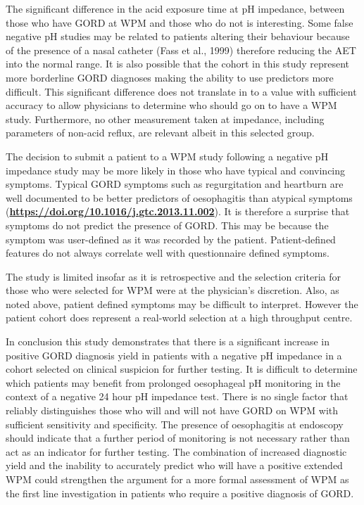 \documentclass[english,man,floatsintext]{apa6}
\begin{document}
The significant difference in the acid exposure time at pH impedance, between those who have GORD at WPM and those who do not is interesting. Some false negative pH studies may be related to patients altering their behaviour because of the presence of a nasal catheter (Fass et al., 1999) therefore reducing the AET into the normal range. It is also possible that the cohort in this study represent more borderline GORD diagnoses making the ability to use predictors more difficult. This significant difference does not translate in to a value with sufficient accuracy to allow physicians to determine who should go on to have a WPM study. Furthermore, no other measurement taken at impedance, including parameters of non-acid reflux, are relevant albeit in this selected group.

The decision to submit a patient to a WPM study following a negative pH impedance study may be more likely in those who have typical and convincing symptoms. Typical GORD symptoms such as regurgitation and heartburn are well documented to be better predictors of oesophagitis than atypical symptoms (\textbf{\url{https://doi.org/10.1016/j.gtc.2013.11.002}}). It is therefore a surprise that symptoms do not predict the presence of GORD. This may be because the symptom was user-defined as it was recorded by the patient. Patient-defined features do not always correlate well with questionnaire defined symptoms.

The study is limited insofar as it is retrospective and the selection criteria for those who were selected for WPM were at the physician's discretion. Also, as noted above, patient defined symptoms may be difficult to interpret. However the patient cohort does represent a real-world selection at a high throughput centre.

In conclusion this study demonstrates that there is a significant increase in positive GORD diagnosis yield in patients with a negative pH impedance in a cohort selected on clinical suspicion for further testing. It is difficult to determine which patients may benefit from prolonged oesophageal pH monitoring in the context of a negative 24 hour pH impedance test. There is no single factor that reliably distinguishes those who will and will not have GORD on WPM with sufficient sensitivity and specificity. The presence of oesophagitis at endoscopy should indicate that a further period of monitoring is not necessary rather than act as an indicator for further testing. The combination of increased diagnostic yield and the inability to accurately predict who will have a positive extended WPM could strengthen the argument for a more formal assessment of WPM as the first line investigation in patients who require a positive diagnosis of GORD.
\end{document}
